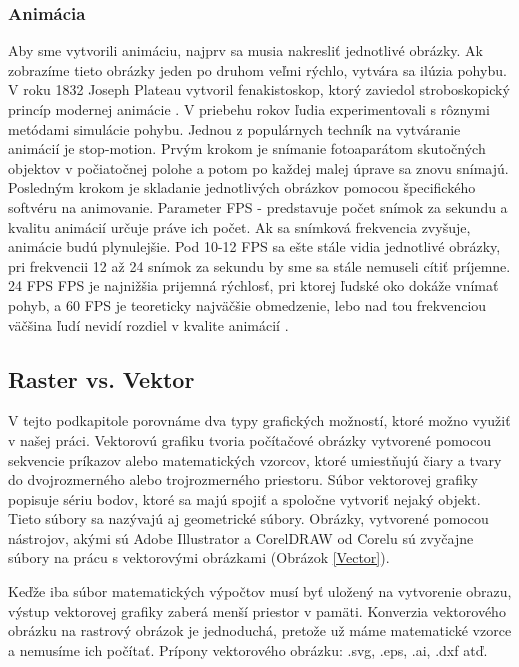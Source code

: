 \subsubsection{Animácia}
Aby sme vytvorili animáciu, najprv sa musia nakresliť jednotlivé obrázky. Ak zobrazíme tieto obrázky jeden po druhom veľmi rýchlo, vytvára sa ilúzia pohybu. V roku 1832 Joseph Plateau vytvoril fenakistoskop, ktorý zaviedol stroboskopický princíp modernej animácie \cite{c17}. V priebehu rokov ľudia experimentovali s rôznymi metódami simulácie pohybu. 
\newline Jednou z populárnych techník na vytváranie animácií je stop-motion. Prvým krokom je snímanie fotoaparátom skutočných objektov v počiatočnej polohe a potom po každej malej úprave sa znovu snímajú. Posledným krokom je  skladanie jednotlivých obrázkov pomocou špecifického softvéru na animovanie.
\newline Parameter \acrshort{FPS} - predstavuje počet snímok za sekundu a kvalitu animácií určuje práve ich počet. Ak sa snímková frekvencia zvyšuje, animácie budú plynulejšie. Pod 10-12 \acrshort{FPS} sa ešte stále vidia jednotlivé obrázky, pri frekvencii 12 až 24 snímok za sekundu by sme sa stále nemuseli cítiť príjemne. 24 \acrshort{FPS} FPS je najnižšia prijemná rýchlosť, pri ktorej ľudské oko dokáže vnímať pohyb, a 60 \acrshort{FPS} je teoreticky najväčšie obmedzenie, lebo nad tou frekvenciou väčšina ľudí nevidí rozdiel v kvalite animácií \cite{c16}.

\subsection{Raster vs. Vektor}
V tejto podkapitole porovnáme dva typy grafických možností, ktoré možno využiť v našej práci.
Vektorovú grafiku tvoria počítačové obrázky vytvorené pomocou sekvencie príkazov alebo matematických vzorcov, ktoré umiestňujú čiary a tvary do dvojrozmerného alebo trojrozmerného priestoru. Súbor vektorovej grafiky popisuje sériu bodov, ktoré sa majú spojiť a spoločne  vytvoriť nejaký objekt. Tieto súbory sa nazývajú aj geometrické súbory. Obrázky,  vytvorené pomocou nástrojov, akými sú Adobe Illustrator a CorelDRAW od Corelu sú zvyčajne súbory na prácu s vektorovými obrázkami \cite{c19} (Obrázok \ref{Vector}).

Keďže iba súbor matematických výpočtov musí byť uložený na vytvorenie obrazu, výstup vektorovej grafiky zaberá menší priestor v pamäti. Konverzia vektorového obrázku na rastrový obrázok je jednoduchá, pretože už máme matematické vzorce a nemusíme ich počítať. Prípony vektorového obrázku: .svg, .eps, .ai, .dxf atď.


